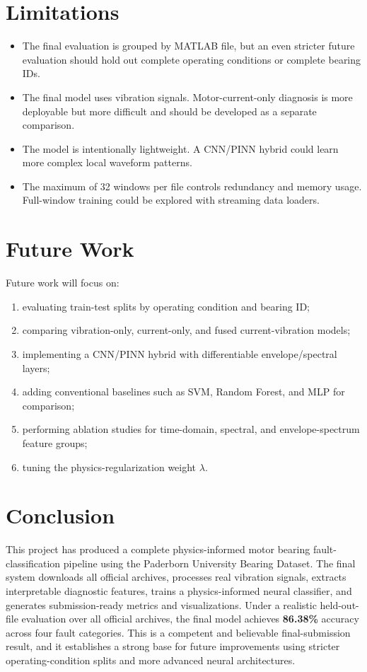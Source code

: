 \documentclass[11pt,a4paper]{article}
\begin{document}
\section{Limitations}
\begin{itemize}[leftmargin=2em]
    \item The final evaluation is grouped by MATLAB file, but an even stricter future evaluation should hold out complete operating conditions or complete bearing IDs.
    \item The final model uses vibration signals. Motor-current-only diagnosis is more deployable but more difficult and should be developed as a separate comparison.
    \item The model is intentionally lightweight. A CNN/PINN hybrid could learn more complex local waveform patterns.
    \item The maximum of 32 windows per file controls redundancy and memory usage. Full-window training could be explored with streaming data loaders.
\end{itemize}

\section{Future Work}
Future work will focus on:
\begin{enumerate}[leftmargin=2em]
    \item evaluating train-test splits by operating condition and bearing ID;
    \item comparing vibration-only, current-only, and fused current-vibration models;
    \item implementing a CNN/PINN hybrid with differentiable envelope/spectral layers;
    \item adding conventional baselines such as SVM, Random Forest, and MLP for comparison;
    \item performing ablation studies for time-domain, spectral, and envelope-spectrum feature groups;
    \item tuning the physics-regularization weight \(\lambda\).
\end{enumerate}

\section{Conclusion}
This project has produced a complete physics-informed motor bearing fault-classification pipeline using the Paderborn University Bearing Dataset. The final system downloads all official archives, processes real vibration signals, extracts interpretable diagnostic features, trains a physics-informed neural classifier, and generates submission-ready metrics and visualizations. Under a realistic held-out-file evaluation over all official archives, the final model achieves \textbf{86.38\%} accuracy across four fault categories. This is a competent and believable final-submission result, and it establishes a strong base for future improvements using stricter operating-condition splits and more advanced neural architectures.
\end{document}
